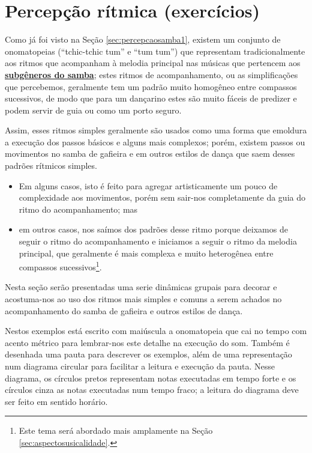 \section{Percepção rítmica (exercícios)}



Como já foi visto na Seção \ref{sec:percepcaosamba1},
existem um conjunto de onomatopeias (``tchic-tchic tum'' e ``tum tum'') que representam tradicionalmente
aos ritmos  que acompanham à melodia principal 
nas músicas que pertencem aos \hyperref[sec:FamiliaSamba]{\textbf{subgêneros do samba}};
estes ritmos de acompanhamento, ou as simplificações que percebemos, 
geralmente tem um padrão muito homogêneo entre compassos sucessivos,
de modo que para um dançarino estes são muito fáceis de predizer 
e podem servir de guia ou como um porto seguro.

Assim, esses ritmos simples geralmente são usados como uma forma que emoldura a execução dos passos básicos 
e alguns mais complexos;
porém, existem passos ou movimentos no samba de gafieira e em outros estilos de dança
que saem desses padrões rítmicos simples. 
\begin{itemize}
\item Em alguns casos,
isto é feito para agregar artisticamente um pouco de complexidade aos movimentos,
porém sem sair-nos completamente da guia do ritmo do acompanhamento; mas 
\item em outros casos, nos saímos dos padrões desse ritmo  
porque deixamos de seguir o ritmo do acompanhamento 
e iniciamos a seguir o ritmo da melodia principal, que geralmente é mais complexa 
e muito heterogênea entre compassos sucessivos\footnote{Este 
tema será abordado mais amplamente na Seção \ref{sec:aspectosusicalidade}.}. 
\end{itemize}


Nesta seção serão presentadas uma serie dinâmicas grupais 
para decorar e acostuma-nos ao uso dos ritmos mais simples e comuns 
a serem achados no acompanhamento do samba de gafieira e outros estilos de dança.

Nestos exemplos está escrito com maiúscula a onomatopeia 
que cai no tempo com acento métrico para lembrar-nos este detalhe na execução do som. 
Também é desenhada uma pauta para descrever os exemplos, 
além de uma representação num diagrama circular 
para facilitar a leitura e execução da pauta.
Nesse diagrama, os círculos pretos representam notas executadas em tempo forte
e os círculos cinza as notas executadas num tempo fraco;
a leitura do diagrama deve ser feito em sentido horário.  


